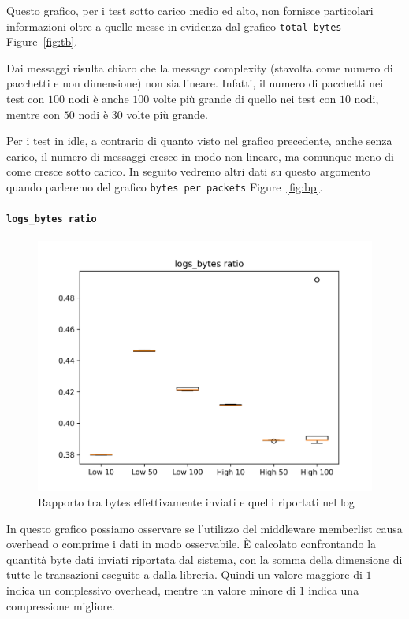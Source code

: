 \documentclass[12pt, a4paper]{article}
\begin{document}
Questo grafico, per i test sotto carico medio ed alto, non fornisce particolari informazioni oltre a quelle messe in evidenza dal grafico \lstinline{total bytes} Figure~\ref{fig:tb}.

Dai messaggi risulta chiaro che la message complexity (stavolta come numero di pacchetti e non dimensione) non sia lineare. Infatti, il numero di pacchetti nei test con $100$ nodi è anche $100$ volte più grande di quello nei test con $10$ nodi, mentre con $50$ nodi è $30$ volte più grande.

Per i test in idle, a contrario di quanto visto nel grafico precedente, anche senza carico, il numero di messaggi cresce in modo non lineare, ma comunque meno di come cresce sotto carico. In seguito vedremo altri dati su questo argomento quando parleremo del grafico \lstinline{bytes per packets} Figure~\ref{fig:bp}.

\paragraph{\lstinline{logs_bytes ratio}}

\begin{figure}[H]
    \includegraphics[width=\linewidth, keepaspectratio]{graphs/logs_bytes ratio.png}
    \caption{Rapporto tra bytes effettivamente inviati e quelli riportati nel log}
    \label{fig:lbr}
\end{figure}

In questo grafico possiamo osservare se l'utilizzo del middleware memberlist causa overhead o comprime i dati in modo osservabile.
È calcolato confrontando la quantità byte dati inviati riportata dal sistema, con la somma della dimensione di tutte le transazioni eseguite a dalla libreria. Quindi un valore maggiore di $1$ indica un complessivo overhead, mentre un valore minore di $1$ indica una compressione migliore.
\end{document}
